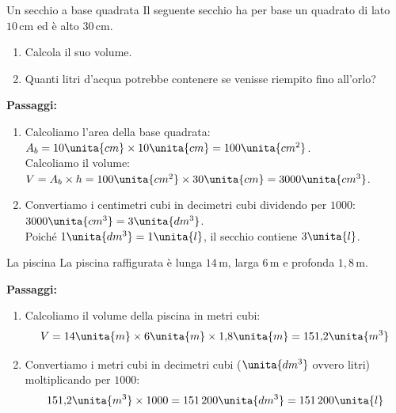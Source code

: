 \begin{esercizio}{Un secchio a base quadrata}
Il seguente secchio ha per base un quadrato di lato $10\,\mathrm{cm}$ ed è alto $30\,\mathrm{cm}$.


\begin{enumerate}[label=\alph*)]
  \item Calcola il suo volume.
  \item Quanti litri d'acqua potrebbe contenere se venisse riempito fino all'orlo?
\end{enumerate}

\responsespace{4.2cm}

\begin{soluzione}
  \textbf{Passaggi:}
  \begin{enumerate}[label=\alph*)]
    \item Calcoliamo l'area della base quadrata: $A_b = 10\unita{cm} \times 10\unita{cm} = 100\unita{cm^2}$.\\
    Calcoliamo il volume: $V = A_b \times h = 100\unita{cm^2} \times 30\unita{cm} = 3000\unita{cm^3}$.
    \item Convertiamo i centimetri cubi in decimetri cubi dividendo per $1000$: $3000\unita{cm^3} = 3\unita{dm^3}$.\\
    Poiché $1\unita{dm^3} = 1\unita{l}$, il secchio contiene $3\unita{l}$.
  \end{enumerate}
\end{soluzione}
\end{esercizio}
\condnewpage
\begin{esercizio}{La piscina}
La piscina raffigurata è lunga $14\,\mathrm{m}$, larga $6\,\mathrm{m}$ e profonda $1{,}8\,\mathrm{m}$.



\responsespace{4.5cm}

\begin{soluzione}
  \textbf{Passaggi:}
  \begin{enumerate}
    \item Calcoliamo il volume della piscina in metri cubi:
    \[
    V = 14\unita{m} \times 6\unita{m} \times 1{,}8\unita{m} = 151{,}2\unita{m^3}
    \]
    \item Convertiamo i metri cubi in decimetri cubi ($\unita{dm^3}$ ovvero litri) moltiplicando per $1000$:
    \[
    151{,}2\unita{m^3} \times 1000 = 151\,200\unita{dm^3} = 151\,200\unita{l}
    \]
  \end{enumerate}
\end{soluzione}
\end{esercizio}

